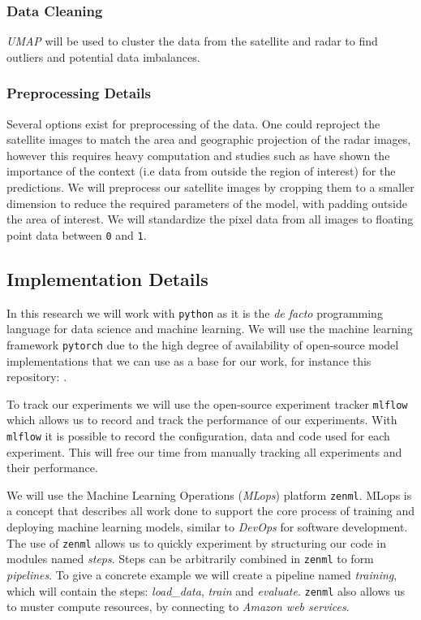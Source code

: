 \documentclass[acmtog, authorversion]{acmart}
\begin{document}
\subsubsection{Data Cleaning} \textit{UMAP} \cite{mcinnes2020umap} will be used to cluster the data from the satellite and radar to find outliers and potential data imbalances.

\subsubsection{Preprocessing Details} Several options exist for preprocessing of the data. One could reproject the satellite images to match the area and geographic projection of the radar images, however this requires heavy computation and studies such as \cite{sønderby2020metnet} have shown the importance of the context (i.e data from outside the region of interest) for the predictions. We will preprocess our satellite images by cropping them to a smaller dimension to reduce the required parameters of the model, with padding outside the area of interest. We will standardize the pixel data from all images to floating point data between \texttt{0} and \texttt{1}.

\subsection{Implementation Details}

In this research we will work with \texttt{python} as it is the \textit{de facto} programming language for data science and machine learning. We will use the machine learning framework \texttt{pytorch} due to the high degree of availability of open-source model implementations that we can use as a base for our work, for instance this repository: \cite{openclimatefix-no-date}.
\medskip

To track our experiments we will use the open-source experiment tracker \texttt{mlflow} which allows us to record and track the performance of our experiments. With \texttt{mlflow} it is possible to record the configuration, data and code used for each experiment. This will free our time from manually tracking all experiments and their performance.
\medskip

We will use the Machine Learning Operations (\textit{MLops}) platform \texttt{zenml}. MLops is a concept that describes all work done to support the core process of training and deploying machine learning models, similar to \textit{DevOps} for software development. The use of \texttt{zenml} allows us to quickly experiment by structuring our code in modules named \textit{steps}. Steps can be arbitrarily combined in \texttt{zenml} to form \textit{pipelines}. To give a concrete example we will create a pipeline named \textit{training}, which will contain the steps: \textit{load\_data}, \textit{train} and \textit{evaluate}. \texttt{zenml} also allows us to muster compute resources, by connecting to \textit{Amazon web services}.
\end{document}
